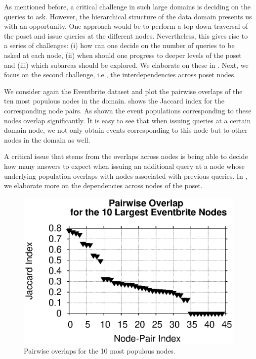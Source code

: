 As mentioned before, a critical challenge in such large domains is deciding on the queries to ask. However, the hierarchical structure of the data domain presents us with an opportunity. One approach would be to perform a top-down traversal of the poset and issue queries at the different nodes. Nevertheless, this gives rise to a series of challenges: (i) how can one decide on the number of queries to be asked at each node, (ii) when should one progress to deeper levels of the poset and (iii) which subareas should be explored. We elaborate on these in . Next, we focus on the second challenge, i.e., the interdependencies across poset nodes. 
\begin{example}
We consider again the Eventbrite dataset and plot the pairwise overlaps of the ten most populous nodes in the domain.  shows the Jaccard index for the corresponding node pairs. As shown the event populations corresponding to these nodes overlap significantly. It is easy to see that when issuing queries at a certain domain node, we not only obtain events corresponding to this node but to other nodes in the domain as well.
\end{example}
A critical issue that stems from the overlaps across nodes is being able to decide how many answers to expect when issuing an additional query at a node whose underlying population overlaps with nodes associated with previous queries. In , we elaborate more on the dependencies across nodes of the poset.
\iftr
\begin{figure}
	\begin{center}
	\vspace{-10pt}
	\includegraphics[clip,scale=0.5]{figs/overlaps.eps}
	\vspace{-10pt}
	\caption{Pairwise overlaps for the 10 most populous nodes.}
	\label{fig:eventbriteover}
	\vspace{-20pt}
	\end{center}
\end{figure}
\fi
